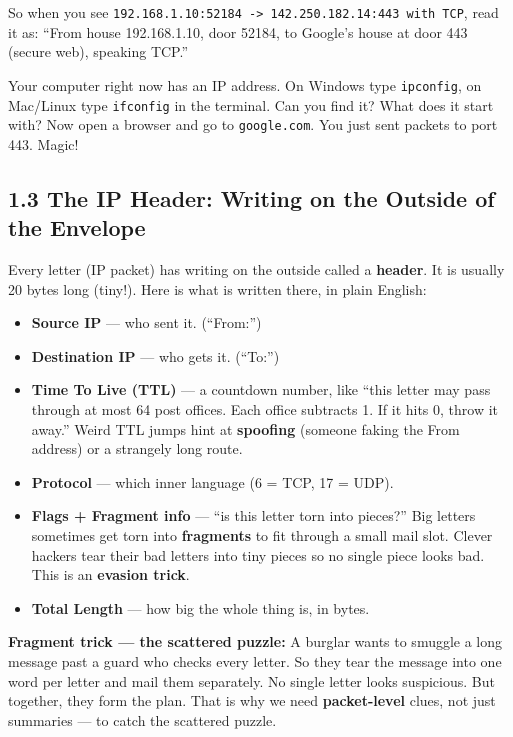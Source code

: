 \documentclass[11pt,a4paper]{article}
\begin{document}
So when you see \texttt{192.168.1.10:52184 -> 142.250.182.14:443 with TCP}, read
it as: ``From house 192.168.1.10, door 52184, to Google's house at door 443
(secure web), speaking TCP.''

\begin{yourturn}
Your computer right now has an IP address. On Windows type \texttt{ipconfig},
on Mac/Linux type \texttt{ifconfig} in the terminal. Can you find it? What
does it start with? Now open a browser and go to \texttt{google.com}. You just
sent packets to port 443. Magic!
\end{yourturn}

\subsection{1.3 The IP Header: Writing on the Outside of the Envelope}
\label{sec:ipheader}

Every letter (IP packet) has writing on the outside called a \textbf{header}.
It is usually 20 bytes long (tiny!). Here is what is written there, in plain
English:

\begin{itemize}[leftmargin=1.6em,itemsep=2pt]
  \item \textbf{Source IP} --- who sent it. (``From:'')
  \item \textbf{Destination IP} --- who gets it. (``To:'')
  \item \textbf{Time To Live (TTL)} --- a countdown number, like ``this letter
        may pass through at most 64 post offices. Each office subtracts 1. If it
        hits 0, throw it away.'' Weird TTL jumps hint at \textbf{spoofing}
        (someone faking the From address) or a strangely long route.
  \item \textbf{Protocol} --- which inner language (6 = TCP, 17 = UDP).
  \item \textbf{Flags + Fragment info} --- ``is this letter torn into pieces?''
        Big letters sometimes get torn into \textbf{fragments} to fit through a
        small mail slot. Clever hackers tear their bad letters into tiny pieces
        so no single piece looks bad. This is an \textbf{evasion trick}.
  \item \textbf{Total Length} --- how big the whole thing is, in bytes.
\end{itemize}

\begin{storybox}
\textbf{Fragment trick --- the scattered puzzle:}
A burglar wants to smuggle a long message past a guard who checks every letter.
So they tear the message into one word per letter and mail them separately.
No single letter looks suspicious. But together, they form the plan. That is
why we need \textbf{packet-level} clues, not just summaries --- to catch the
scattered puzzle.
\end{storybox}
\end{document}
